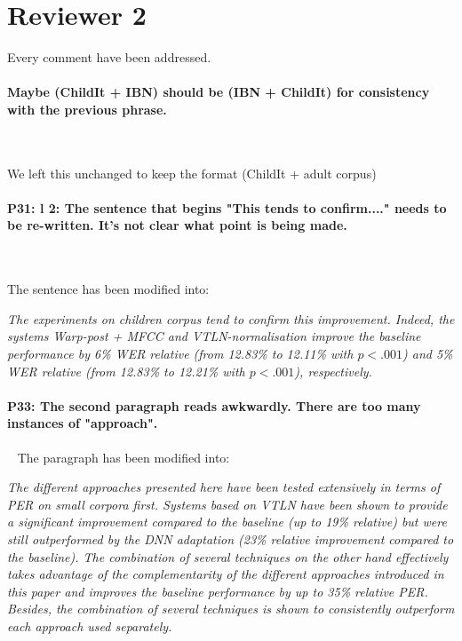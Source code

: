 \documentclass[]{article}
\begin{document}
\section{Reviewer 2}

Every comment have been addressed.

\paragraph{Maybe (ChildIt + IBN) should be (IBN + ChildIt) for consistency with the previous phrase.}

~

We left this unchanged to keep the format (ChildIt + adult corpus)

\paragraph{P31: l 2: The sentence that begins "This tends to confirm...." needs to be re-written. It's not clear what point is being made.}

~

The sentence has been modified into:

\textit{The experiments on children corpus tend to confirm this improvement. Indeed, the systems {\em Warp-post + MFCC} and {\em VTLN-normalisation} improve the baseline performance by 6\% WER relative (from 12.83\% to 12.11\% with $p<.001$) and 5\% WER relative (from 12.83\% to 12.21\% with $p<.001$), respectively.}

\paragraph{P33: The second paragraph reads awkwardly. There are too many instances of "approach".}

~
The paragraph has been modified into: 

\textit{The different approaches presented here have been tested extensively in terms of PER on small corpora first. Systems based on VTLN have been shown to provide a significant improvement compared to the baseline (up to 19\% relative) but were still outperformed by the DNN adaptation (23\% relative improvement compared to the baseline). The combination of several techniques on the other hand effectively takes advantage of the complementarity of the different approaches introduced in this paper and improves the baseline performance by up to 35\% relative PER. Besides, the combination of several techniques is shown to consistently outperform each approach used separately.}
\end{document}
